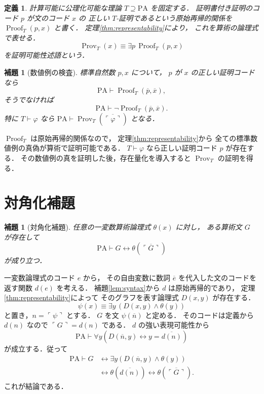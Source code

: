 \documentclass[a5paper,10pt,onecolumn]{jsarticle}
\makeatletter
\theoremstyle{mathnotetheorem}
\newtheorem{definition}[theorem]{定義}
\newtheorem{lemma}[theorem]{補題}
\renewcommand{\proofname}{証明}
\renewenvironment{proof}[1][\proofname]{%
  \par\pushQED{\qed}\normalfont\topsep4\p@\@plus2\p@\relax
  \trivlist\item[\hskip\labelsep\bfseries #1]\ignorespaces
}{\popQED\endtrivlist\@endpefalse}
\makeatother
\begin{document}
\begin{definition}
計算可能に公理化可能な理論
$T\supseteq\mathrm{PA}$ を固定する．
証明書付き証明のコード $p$ が文のコード $x$ の
正しい $T$-証明であるという原始再帰的関係を
$\operatorname{Proof}_T(p,x)$ と書く．
定理\ref{thm:representability}により，
これを算術の論理式で表せる．
\[
 \operatorname{Prov}_T(x)
 \equiv\exists p\,\operatorname{Proof}_T(p,x)
\]
を証明可能性述語という．
\end{definition}

\begin{lemma}[数値例の検査]\label{lem:proof-numeral}
標準自然数 $p,x$ について，
$p$ が $x$ の正しい証明コードなら
\[
 \mathrm{PA}\vdash
 \operatorname{Proof}_T(\overline p,\overline x),
\]
そうでなければ
\[
 \mathrm{PA}\vdash
 \neg\operatorname{Proof}_T(\overline p,\overline x).
\]
特に $T\vdash\varphi$ なら
$\mathrm{PA}\vdash
 \operatorname{Prov}_T(\overline{\ulcorner\varphi\urcorner})$
となる．
\end{lemma}
\begin{proof}
$\operatorname{Proof}_T$ は原始再帰的関係なので，
定理\ref{thm:representability}から
全ての標準数値例の真偽が算術で証明可能である．
$T\vdash\varphi$ なら正しい証明コード $p$ が存在する．
その数値例の真を証明した後，存在量化を導入すると
$\operatorname{Prov}_T$ の証明を得る．
\end{proof}

\section{対角化補題}

\begin{lemma}[対角化補題]\label{lem:diagonal}
任意の一変数算術論理式 $\theta(x)$ に対し，
ある算術文 $G$ が存在して
\[
 \mathrm{PA}\vdash
 G\leftrightarrow
 \theta(\overline{\ulcorner G\urcorner})
\]
が成り立つ．
\end{lemma}
\begin{proof}
一変数論理式のコード $e$ から，
その自由変数に数詞 $\overline e$ を代入した文のコードを
返す関数 $d(e)$ を考える．
補題\ref{lem:syntax}から $d$ は原始再帰的であり，
定理\ref{thm:representability}によって
そのグラフを表す論理式 $D(x,y)$ が存在する．
\[
 \psi(x)\equiv\exists y\,
 (D(x,y)\land\theta(y))
\]
と置き，$n=\ulcorner\psi\urcorner$ とする．
$G$ を文 $\psi(\overline n)$ と定める．
そのコードは定義から $d(n)$ なので
$\ulcorner G\urcorner=d(n)$ である．
$d$ の強い表現可能性から
\[
 \mathrm{PA}\vdash
 \forall y\left(D(\overline n,y)
 \leftrightarrow y=\overline{d(n)}\right)
\]
が成立する．従って
\[
 \begin{aligned}
 \mathrm{PA}\vdash
 G&\leftrightarrow
 \exists y(D(\overline n,y)\land\theta(y))\\
 &\leftrightarrow\theta(\overline{d(n)})
 \leftrightarrow\theta(\overline{\ulcorner G\urcorner}).
 \end{aligned}
\]
これが結論である．
\end{proof}
\end{document}
